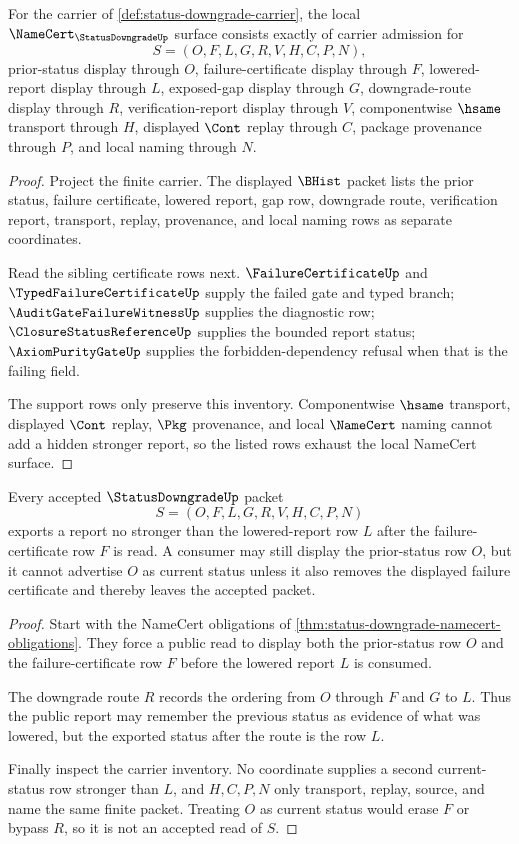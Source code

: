 \begin{theorem}
\label{thm:status-downgrade-namecert-obligations}
For the carrier of \autoref{def:status-downgrade-carrier}, the local $\NameCert_{\StatusDowngradeUp}$ surface consists exactly of carrier admission for
$$
S=(O,F,L,G,R,V,H,C,P,N),
$$
prior-status display through $O$, failure-certificate display through $F$, lowered-report display through $L$, exposed-gap display through $G$, downgrade-route display through $R$, verification-report display through $V$, componentwise $\hsame$ transport through $H$, displayed $\Cont$ replay through $C$, package provenance through $P$, and local naming through $N$.
\end{theorem}
\begin{proof}
Project the finite carrier. The displayed $\BHist$ packet lists the prior status, failure certificate, lowered report, gap row, downgrade route, verification report, transport, replay, provenance, and local naming rows as separate coordinates.

Read the sibling certificate rows next. $\FailureCertificateUp$ and $\TypedFailureCertificateUp$ supply the failed gate and typed branch; $\AuditGateFailureWitnessUp$ supplies the diagnostic row; $\ClosureStatusReferenceUp$ supplies the bounded report status; $\AxiomPurityGateUp$ supplies the forbidden-dependency refusal when that is the failing field.

The support rows only preserve this inventory. Componentwise $\hsame$ transport, displayed $\Cont$ replay, $\Pkg$ provenance, and local $\NameCert$ naming cannot add a hidden stronger report, so the listed rows exhaust the local NameCert surface.
\end{proof}

\begin{theorem}
\label{thm:status-downgrade-strength-monotonicity}
Every accepted $\StatusDowngradeUp$ packet
$$
S=(O,F,L,G,R,V,H,C,P,N)
$$
exports a report no stronger than the lowered-report row $L$ after the failure-certificate row $F$ is read. A consumer may still display the prior-status row $O$, but it cannot advertise $O$ as current status unless it also removes the displayed failure certificate and thereby leaves the accepted packet.
\end{theorem}
\begin{proof}
Start with the NameCert obligations of \autoref{thm:status-downgrade-namecert-obligations}. They force a public read to display both the prior-status row $O$ and the failure-certificate row $F$ before the lowered report $L$ is consumed.

The downgrade route $R$ records the ordering from $O$ through $F$ and $G$ to $L$. Thus the public report may remember the previous status as evidence of what was lowered, but the exported status after the route is the row $L$.

Finally inspect the carrier inventory. No coordinate supplies a second current-status row stronger than $L$, and $H,C,P,N$ only transport, replay, source, and name the same finite packet. Treating $O$ as current status would erase $F$ or bypass $R$, so it is not an accepted read of $S$.
\end{proof}

